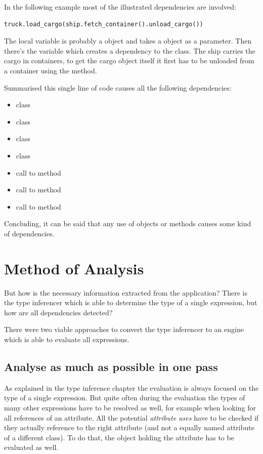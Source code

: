 \documentclass[12pt,halfparskip,DIV11,BCOR10mm]{scrreprt}
\begin{document}
In the following example most of the illustrated dependencies are involved:

\begin{lstlisting}
truck.load_cargo(ship.fetch_container().unload_cargo())
\end{lstlisting}

The local variable  is probably a  object and  takes a  object as a parameter. Then there's the  variable which creates a dependency to the  class. The ship carries the cargo in containers, to get the cargo object itself it first has to be unloaded from a container using the  method.

Summarised this single line of code causes all the following dependencies:

\begin{itemize}
    \item class 
    \item class 
    \item class 
    \item class 
    \item call to method 
    \item call to method 
    \item call to method 
\end{itemize}

Concluding, it can be said that any use of objects or methods causes some kind of dependencies.

\section{Method of Analysis}

But how is the necessary information extracted from the application? There is the type inferencer which is able to determine the type of a single expression, but how are all dependencies detected?

There were two viable approaches to convert the type inferencer to an engine which is able to evaluate all expressions. 

\subsection{Analyse as much as possible in one pass}

As explained in the type inference chapter the evaluation is always focused on the type of a single expression. But quite often during the evaluation the types of many other expressions have to be resolved as well, for example when looking for all references of an attribute. All the potential \emph{attribute uses} have to be checked if they actually reference to the right attribute (and not a equally named attribute of a different class). To do that, the object holding the attribute has to be evaluated as well.
\end{document}
